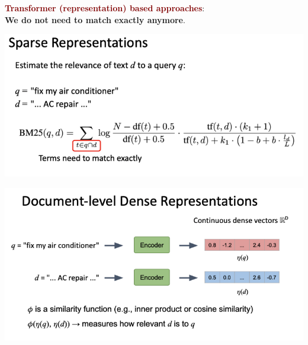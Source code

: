 \textbf{\textcolor{Maroon}{Transformer (representation) based approaches}}: \\
\textbf{We do not need to match exactly anymore}. \\
\begin{minipage}{0.5\textwidth}
\includegraphics[scale=0.5]{figures/repr1.png}
\end{minipage}
\begin{minipage}{0.5\textwidth}
\includegraphics[scale=0.5]{figures/repr2.png}
\end{minipage}

\vspace{1cm}

